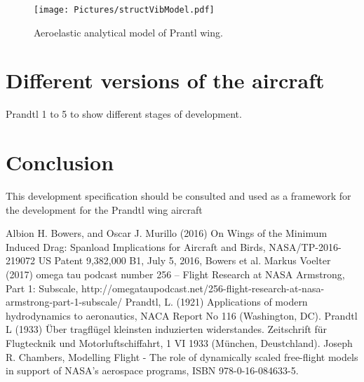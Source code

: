 \documentclass{report}
\begin{document}
\begin{figure}[htb]
	\begin{center}
		\texttt{[image: Pictures/structVibModel.pdf]}
	\end{center}

	\caption{Aeroelastic analytical model of Prantl wing.}
	\label{fig: structVibModel}
\end{figure}

\section{Different versions of the aircraft}

Prandtl 1 to 5 to show different stages of development.

\section{Conclusion}
This development specification should be consulted and used as a framework for the development for the Prandtl wing aircraft


\begin{thebibliography}{99}
 Albion H. Bowers, and Oscar J. Murillo (2016) On Wings of the Minimum Induced Drag:  Spanload Implications for Aircraft and Birds, NASA/TP-2016-219072
 US Patent 9,382,000 B1, July 5, 2016, Bowers et al.
 Markus Voelter (2017) omega tau podcast number 256 – Flight Research at NASA Armstrong, Part 1: Subscale, http://omegataupodcast.net/256-flight-research-at-nasa-armstrong-part-1-subscale/
 Prandtl, L.  (1921)  Applications  of  modern hydrodynamics  to  aeronautics,  NACA  Report  No  116 (Washington, DC).
 Prandtl L (1933) Über tragfl\"ugel kleinsten induzierten widerstandes. Zeitschrift für Flugtecknik und Motorluftschiffahrt, 1 VI 1933 (M\"unchen, Deustchland).
 Joseph R. Chambers, Modelling Flight - The role of dynamically scaled free-flight models in support of NASA's aerospace programs, ISBN 978-0-16-084633-5.
\end{thebibliography}
\end{document}
